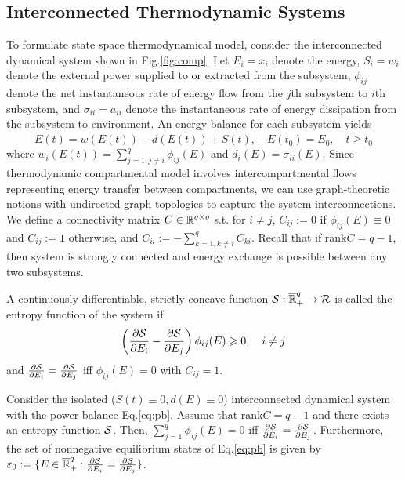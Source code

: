 \documentclass{paper}
\begin{document}
\subsection{Interconnected Thermodynamic Systems}
To formulate state space thermodynamical model, consider the interconnected dynamical system shown in Fig.\ref{fig:comp}.
Let $E_i=x_i$ denote the energy, $S_i=w_i$ denote the external power supplied to or extracted from the subsystem, $\phi_{ij}$
denote the net instantaneous rate of energy flow from the $j$th subsystem to $i$th subsystem, and $\sigma_{ii}=a_{ii}$ denote 
the instantaneous rate of energy dissipation from the subsystem to environment. An energy balance for each subsystem yields
\begin{equation}\label{eq:pb}
\dot{E}(t)=w(E(t))-d(E(t))+S(t),\quad E(t_0)=E_0,\quad t\geqslant t_0
\end{equation}
where $w_i(E(t))=\sum_{j=1,j\neq i}^{q}\phi_{ij}(E)$ and $d_i(E)=\sigma_{ii}(E)$. 
Since thermodynamic compartmental model involves intercompartmental flows representing energy transfer between compartments, 
we can use graph-theoretic notions with undirected graph topologies to capture the system interconnections. We define a
connectivity matrix $C\in\mathbb{R}^{q\times q}$ s.t. for $i\neq j$, $C_{ij}:=0$ if $\phi_{ij}(E)\equiv 0$ and $C_{ij}:=1$ otherwise,
and $C_{ii}:=-\sum_{k=1,k\neq i}^{q}C_{ki}$. Recall that if rank$C=q-1$, then system is strongly connected and energy exchange
is possible between any two subsystems.
\begin{defi}
A continuously differentiable, strictly concave function $\mathcal{S}:\overline{\mathbb{R}}_{+}^{q}\rightarrow \mathcal{R}$ is 
called the entropy function of the system if
\begin{equation}\label{eq:t2}
\left(\frac{\partial \mathcal{S}}{\partial E_i}-\frac{\partial \mathcal{S}}{\partial E_j}\right)\phi_{ij}(E)\geqslant 0, \quad i\neq j
\end{equation}
and $\frac{\partial \mathcal{S}}{\partial E_i}=\frac{\partial \mathcal{S}}{\partial E_j}$ iff $\phi_{ij}(E)=0$ with $C_{ij}=1$.
\end{defi}
\begin{prop}
Consider the isolated ($S(t)\equiv 0, d(E)\equiv 0$) interconnected dynamical system with the power balance Eq.\ref{eq:pb}.
Assume that rank$C=q-1$ and there exists an entropy function $\mathcal{S}$. Then, $\sum_{j=1}^{q}\phi_{ij}(E)=0$ iff $
\frac{\partial \mathcal{S}}{\partial E_i}=\frac{\partial \mathcal{S}}{\partial E_j}$. Furthermore, the set of nonnegative equilibrium states of
Eq.\ref{eq:pb} is given by $\varepsilon_0:=\{E\in\overline{\mathbb{R}}_{+}^{q}: \frac{\partial \mathcal{S}}{\partial E_i}=
\frac{\partial \mathcal{S}}{\partial E_j}\}$.
\end{prop}
\end{document}
